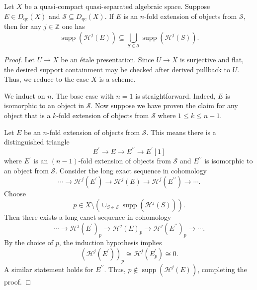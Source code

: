 \documentclass[10pt,a4paper]{amsart}
\begin{document}
\begin{lemma}
    \label{lem:cohomology_vanish_from_aisle}
    Let $X$ be a quasi-compact quasi-separated algebraic space. 
    Suppose $E\in D_{\operatorname{qc}}(X)$ and $\mathcal{S}\subseteq  D_{\operatorname{qc}}(X)$. 
    If $E$ is an $n$-fold extension of objects from $\mathcal{S}$, then for any $j\in \mathbb{Z}$ one has 
    \begin{displaymath}
       \operatorname{supp}(\mathcal{H}^j (E))\subseteq \bigcup_{S\in  \mathcal{S}} \operatorname{supp}(\mathcal{H}^j (S)).
    \end{displaymath}
\end{lemma}

\begin{proof}
    Let $U \to X$ be an \'{e}tale presentation. 
    Since $U\to X$ is surjective and flat, the desired support containment may be checked after derived pullback to $U$. 
    Thus, we reduce to the case $X$ is a scheme. 

    We induct on $n$. 
    The base case with $n=1$ is straightforward. 
    Indeed, $E$ is isomorphic to an object in $\mathcal{S}$. 
    Now suppose we have proven the claim for any object that is a $k$-fold extension of objects from $\mathcal{S}$ where $1\leq k \leq  n-1$. 
    
    Let $E$ be an $n$-fold extension of objects from $\mathcal{S}$. 
    This means there is a distinguished triangle
    \begin{displaymath}
        E^\prime \to E \to E^{\prime \prime} \to E^{\prime}[1]
    \end{displaymath}
    where $E^\prime$ is an $(n-1)$-fold extension of objects from $\mathcal{S}$ and $E^{\prime \prime}$ is isomorphic to an object from $\mathcal{S}$. 
    Consider the long exact sequence in cohomology 
    \begin{displaymath}
        \cdots \to \mathcal{H}^j (E^\prime) \to \mathcal{H}^j (E) \to \mathcal{H}^j (E^{\prime \prime}) \to \cdots.
    \end{displaymath}
    Choose 
    \begin{displaymath}
        p \in X\setminus (\cup_{S\in  \mathcal{S}} \operatorname{supp}(\mathcal{H}^j (S))).
    \end{displaymath} 
    Then there exists a long exact sequence in cohomology
    \begin{displaymath}
        \cdots \to \mathcal{H}^j (E^\prime)_p \to \mathcal{H}^j (E)_p \to \mathcal{H}^j (E^{\prime \prime})_p \to \cdots.
    \end{displaymath}
    By the choice of $p$, the induction hypothesis implies 
    \begin{displaymath}
        (\mathcal{H}^j (E^\prime))_p \cong \mathcal{H}^j (E^\prime_p) \cong 0. 
    \end{displaymath} 
    A similar statement holds for $E^{\prime \prime}$. 
    Thus, $p\not \in \operatorname{supp}(\mathcal{H}^j (E))$, completing the proof.
\end{proof}
\end{document}
